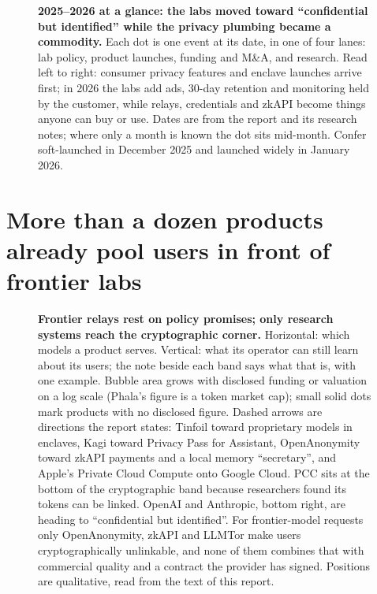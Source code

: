 \documentclass[10pt,a4paper]{article}
\begin{document}
\begin{figure}[tbp]
\centering
{}
\caption{\textbf{2025--2026 at a glance: the labs moved toward ``confidential but identified'' while the privacy plumbing became a commodity.} Each dot is one event at its date, in one of four lanes: lab policy, product launches, funding and M\&A, and research. Read left to right: consumer privacy features and enclave launches arrive first; in 2026 the labs add ads, 30-day retention and monitoring held by the customer, while relays, credentials and zkAPI become things anyone can buy or use. Dates are from the report and its research notes; where only a month is known the dot sits mid-month. Confer soft-launched in December 2025 and launched widely in January 2026.}
\label{fig:timeline}
\end{figure}

\section{More than a dozen products already pool users in front of frontier labs}

\begin{figure}[tbp]
\centering
{}
\caption{\textbf{Frontier relays rest on policy promises; only research systems reach the cryptographic corner.} Horizontal: which models a product serves. Vertical: what its operator can still learn about its users; the note beside each band says what that is, with one example. Bubble area grows with disclosed funding or valuation on a log scale (Phala's figure is a token market cap); small solid dots mark products with no disclosed figure. Dashed arrows are directions the report states: Tinfoil toward proprietary models in enclaves, Kagi toward Privacy Pass for Assistant, OpenAnonymity toward zkAPI payments and a local memory ``secretary'', and Apple's Private Cloud Compute onto Google Cloud. PCC sits at the bottom of the cryptographic band because researchers found its tokens can be linked. OpenAI and Anthropic, bottom right, are heading to ``confidential but identified''. For frontier-model requests only OpenAnonymity, zkAPI and LLMTor make users cryptographically unlinkable, and none of them combines that with commercial quality and a contract the provider has signed. Positions are qualitative, read from the text of this report.}
\label{fig:map}
\end{figure}
\end{document}
